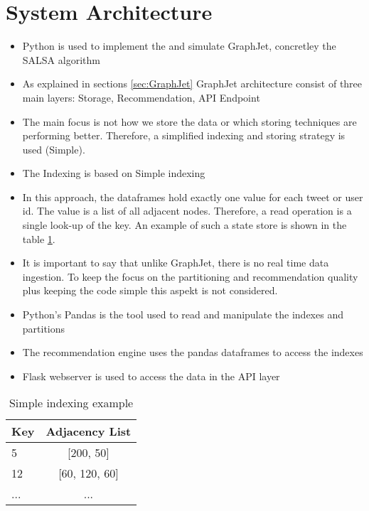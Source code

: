 \section{System Architecture}
\label{System Architecture}

\begin{itemize}
	\item Python is used to implement the and simulate GraphJet, concretley the SALSA algorithm
	\item As explained in sections \ref{sec:GraphJet} GraphJet architecture consist of three main layers: Storage, Recommendation, API Endpoint
	\item The main focus is not how we store the data or which storing techniques are performing better. Therefore, a simplified indexing and storing strategy is used (Simple).
	\item The Indexing is based on Simple indexing
	\item In this approach, the dataframes hold exactly one value for each tweet or user id. The value is a list of all adjacent nodes. Therefore, a read operation is a single look-up of the key. An example of such a state store is shown in the table \ref{tab:simple-indexing}.
	\item It is important to say that unlike GraphJet, there is no real time data ingestion. To keep the focus on the partitioning and recommendation quality plus keeping the code simple this aspekt is not considered.
	\item Python's Pandas is the tool used to read and manipulate the indexes and partitions
	\item The recommendation engine uses the pandas dataframes to access the indexes
	\item Flask webserver is used to access the data in the API layer
\end{itemize}

\begin{table}[!h]
	\centering
	\caption{Simple indexing example}
	\label{tab:simple-indexing}
	\begin{tabular}{|l|c|}
		\hline
		\textbf{Key} & \textbf{Adjacency List} \\
		\hline
		5 & [200, 50] \\
		\hline
		12 & [60, 120, 60] \\
		\hline
		... & ... \\
		\hline
	\end{tabular}
\end{table}


